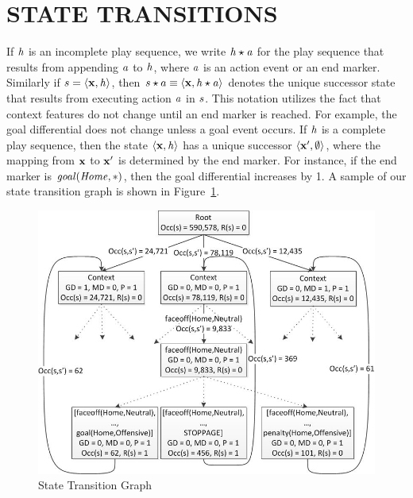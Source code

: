 \documentclass[]{article}
\begin{document}
\section{STATE TRANSITIONS}
\label{sec:transitions}
If $\it{h}$ is an incomplete play sequence, we write $\it{h} \star a$ for the play sequence that results from appending $a$ to $\it{h}$, where $a$ is an action event or an end marker. Similarly if $s = \langle \mathbf{x}, \it{h} \rangle$, then $s \star a \equiv \langle \mathbf{x}, \it{h} \star a \rangle$ denotes the unique successor state that results from executing action $a$ in  $s$. This notation utilizes the fact that context features do not change until an end marker is reached. For example, the goal differential does not change unless a goal event occurs. If $\it{h}$ is a complete play sequence, then the state $\langle \mathbf{x}, \it{h} \rangle$ has a  unique successor $\langle \mathbf{x}', \emptyset \rangle$, where the mapping from $\mathbf{x}$ to $\mathbf{x}'$ is determined by the end marker. For instance, if the end marker is $\it{goal}(Home,*)$, then the goal differential increases by 1. A sample of our state transition graph is shown in Figure~\ref{fig:state-transition-graph}.

\begin{figure}[ht]
\includegraphics[width = 1.0\columnwidth]{sample_state_transition_graph}
\caption{State Transition Graph}
\label{fig:state-transition-graph}
\end{figure}
\end{document}
